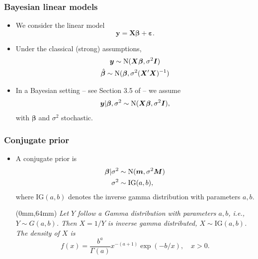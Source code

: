 \documentclass[xcolor=table,10pt]{beamer}
\newenvironment{reference}[2]{%
  \begin{textblock*}{\textwidth}(#1,#2) 
      \footnotesize\it\bgroup\color{red!50!black}}{\egroup\end{textblock*}
}
\begin{document}
\begin{frame}
  \frametitle{Bayesian linear models}
  \begin{itemize}
  \item We consider the linear model
\begin{equation*}
  \bm y = \bm X \bm \beta + \bm\varepsilon.
\end{equation*}
\vspace*{-\baselineskip}
\item Under the classical (strong) assumptions,
\begin{gather*}
  \bm y\sim {\rm N}(\bm X\bm \beta, \sigma^2\bm I)\\
  \hat{\bm\beta} \sim {\rm N}(\bm \beta, \sigma^2 (\bm
  X'\bm X)^{-1})
\end{gather*}
\vspace*{-\baselineskip}
\item In a Bayesian setting -- see Section 3.5 of \citep{Fahrmeir2009}
  --  we assume
\begin{equation*}
  \bm y|\bm \beta, \sigma^2\sim {\rm N}(\bm X\bm \beta,
  \sigma^2\bm I),
\end{equation*}
with $\bm\beta$ and $\sigma^2$ stochastic.
\end{itemize}
\end{frame}

\begin{frame}
  \frametitle{Conjugate prior}
  \begin{itemize}
\item A conjugate prior is 
\begin{align*}
  \bm \beta|\sigma^2&\sim {\rm N}(\bm m, \sigma^2 \bm M)\\
  \sigma^2 &\sim \text{IG}(a,b),
\end{align*}
where $\text{IG}(a,b)$ denotes the inverse gamma distribution with
parameters $a, b$.\footnotemark[1]
\begin{reference}{0mm}{64mm}
Let $Y$ follow a Gamma distribution with
  parameters $a,b$, i.e., $Y\sim G(a,b)$. Then $X=1/Y$ is {\em inverse
  gamma} distributed, $X\sim \text{IG}(a,b)$. The density of $X$ is
  \begin{equation*}
    f(x) = \frac{b^a}{\Gamma(a)} x^{-(a+1)} \exp(-b/x), \quad x>0. 
  \end{equation*}
\end{reference}
\vspace*{3\baselineskip}
\end{itemize}
\end{frame}
\end{document}
